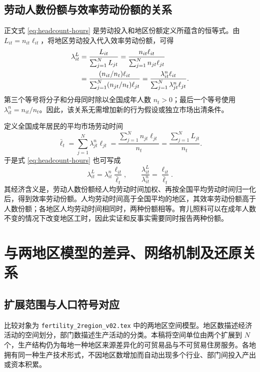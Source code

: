 \documentclass[UTF8,a4paper,zihao=-4,fontset=windows]{ctexart}
\numberwithin{equation}{section}
\begin{document}
\subsection{劳动人数份额与效率劳动份额的关系}
\label{app:headcount-hours}

正文式 \eqref{eq:headcount-hours} 是劳动投入和地区份额定义所蕴含的恒等式。由 $L_{it}=n_{it}\ell_{it}$，将地区劳动投入代入效率劳动份额，可得
\begin{align}
  \lambda^L_{it}
   &=\frac{L_{it}}{\sum_{j=1}^NL_{jt}}
     =\frac{n_{it}\ell_{it}}{\sum_{j=1}^Nn_{jt}\ell_{jt}}
       \notag\\
   &=\frac{(n_{it}/n_t)\ell_{it}}
           {\sum_{j=1}^N(n_{jt}/n_t)\ell_{jt}}
     =\frac{\lambda^n_{it}\ell_{it}}
           {\sum_{j=1}^N\lambda^n_{jt}\ell_{jt}}.
  \label{eq:app-share-derivation}
\end{align}
第三个等号将分子和分母同时除以全国成年人数 $n_t>0$；最后一个等号使用 $\lambda^n_{it}=n_{it}/n_t$。因此，该关系无需增加新的行为假设或独立市场出清条件。

定义全国成年居民的平均市场劳动时间
\begin{equation}
  \bar\ell_t
    =\sum_{j=1}^N\lambda^n_{jt}\ell_{jt}
    =\frac{\sum_{j=1}^Nn_{jt}\ell_{jt}}{n_t}
    =\frac{\sum_{j=1}^N L_{jt}}{n_t}.
  \label{eq:app-national-average-hours}
\end{equation}
于是式 \eqref{eq:headcount-hours} 也可写成
\begin{equation}
  \lambda^L_{it}
     =\lambda^n_{it}\frac{\ell_{it}}{\bar\ell_t},\qquad
  \frac{\lambda^L_{it}}{\lambda^n_{it}}
     =\frac{\ell_{it}}{\bar\ell_t}.
  \label{eq:app-relative-hours-share}
\end{equation}
其经济含义是，劳动人数份额经人均劳动时间加权、再按全国平均劳动时间归一化后，得到效率劳动份额。人均劳动时间高于全国平均的地区，其效率劳动份额高于人数份额；各地区人均劳动时间相同时，两种份额相等。育儿照料可以在成年人数不变的情况下改变地区工时，因此实证和反事实需要同时报告两种份额。

\section{与两地区模型的差异、网络机制及还原关系}
\label{app:extension-comparison}

\subsection{扩展范围与人口符号对应}
比较对象为 \texttt{fertility\_2region\_v02.tex} 中的两地区空间模型。地区数描述经济活动的空间划分，部门数描述生产活动的分类。本稿将空间单位由两个扩展到 $N$ 个，生产结构仍为每地一种地区来源差异化的可贸易品与不可贸易住房服务。各地拥有同一种生产技术形式，不因地区数增加而自动出现多个行业、部门间投入产出或资本积累。
\end{document}
